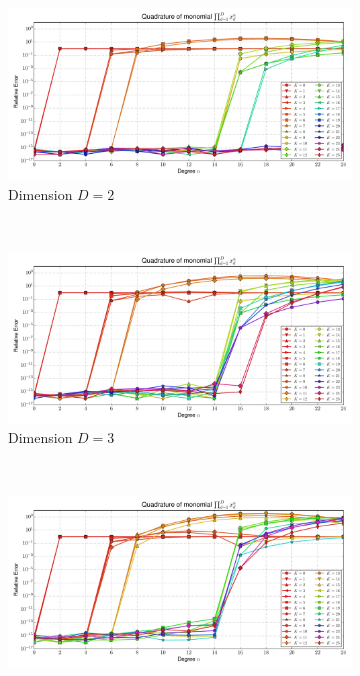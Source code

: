 \documentclass[a4paper,10pt]{article}
\begin{document}
\begin{figure}
  \begin{subfigure}[b]{\linewidth}
    \centering
    \includegraphics[width=\linewidth]{./img/monomial_errors_hermitephy_multivariate_dimension_2.pdf}
    \caption{Dimension $D=2$}
    \label{fig:monomial_errors_hermitephy_multivariate_dimension_2}
  \end{subfigure} \\
  \begin{subfigure}[b]{\linewidth}
    \centering
    \includegraphics[width=\linewidth]{./img/monomial_errors_hermitephy_multivariate_dimension_3.pdf}
    \caption{Dimension $D=3$}
    \label{fig:monomial_errors_hermitephy_multivariate_dimension_3}
  \end{subfigure} \\
  \begin{subfigure}[b]{\linewidth}
    \centering
    \includegraphics[width=\linewidth]{./img/monomial_errors_hermitephy_multivariate_dimension_4.pdf}

\end{subfigure}
\end{figure}
\end{document}
